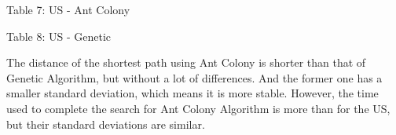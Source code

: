 \documentclass{article}
\begin{document}
\begin{center}
    Table 7: US - Ant Colony
\end{center}
\begin{center}

\begin{center}
    Table 8: US - Genetic
\end{center}
\end{center}

The distance of the shortest path using Ant Colony is shorter than that of Genetic Algorithm, but without a lot of differences. And the former one has a smaller standard deviation, which means it is more stable. However, the time used to complete the search for Ant Colony Algorithm is more than for the US, but their standard deviations are similar.
\end{document}

